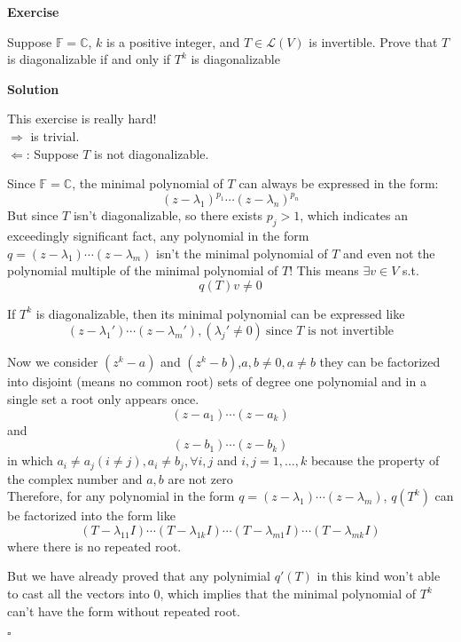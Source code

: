 \documentclass{article}
\newenvironment{exercise}{%
{\textbf{Exercise\\}
    }
}{
}
\newenvironment{solution}{%
{
    \textbf{Solution\\}
    }
}{
  \hfill $\square$ 
  \par\bigskip 
}
\newcommand{\CC}{\mathbb{C}}
\newcommand{\FF}{\mathbb{F}}
\begin{document}
\begin{CJK}{UTF8}{gkai}
\begin{exercise}
    Suppose $\FF = \CC$, $k$ is a positive integer, and $T \in \mathcal{L}(V)$ is invertible. Prove that $T$ is diagonalizable if and only if $T^k$ is diagonalizable
\end{exercise}

\begin{solution}
    This exercise is really hard!\\

    $\Rightarrow$ is trivial.\\

    $\Leftarrow$: Suppose $T$ is not diagonalizable.

    Since $\FF = \CC$, the minimal polynomial of $T$ can always be expressed in the form:
    \[(z - \lambda_1)^{p_1}\cdots (z - \lambda_n)^{p_n}\]
    But since $T$ isn't diagonalizable, so there exists $p_j >1$, which indicates an exceedingly significant fact, any polynomial in the form $q = (z - \lambda_1) \cdots (z - \lambda_m)$ isn't the minimal polynomial of $T$ and even not the polynomial multiple of the minimal polynomial of $T$! This means $\exists v \in V$ s.t.
    \[q(T)v \neq 0 \]

    If $T^k$ is diagonalizable, then its minimal polynomial can be expressed like 
    \[(z - \lambda_1')\cdots(z - \lambda_m'),(\lambda_j' \neq 0) ~\text{since $T$ is not invertible}\]

    Now we consider $(z^k - a)$ and $(z^k - b)$,$a, b \neq 0, a\neq b$ they can be factorized into disjoint (means no common root) sets of degree one polynomial and in a single set a root only appears once.
    \[(z - a_1)\cdots(z - a_k)\]
    and
    \[(z - b_1)\cdots(z - b_k)\]
    in which $a_i \neq a_j (i \neq j), a_i \neq b_j ,\forall i,j $ and $i,j = 1,\ldots,k$ because the property of the complex number and $a,b$ are not zero\\

    Therefore, for any polynomial in the form $q = (z - \lambda_1) \cdots (z - \lambda_m)$, $q(T^k)$ can be factorized into the form like
    \[(T - \lambda_{11} I)\cdots(T - \lambda_{1k} I)\cdots(T - \lambda_{m1} I)\cdots(T - \lambda_{mk} I)\]
    where there is no repeated root.

    But we have already proved that any polynimial $q'(T)$ in this kind won't able to cast all the vectors into $0$, which implies that the minimal polynomial of $T^k$ can't have the form without repeated root. 



\end{solution}
\end{CJK}
\end{document}
